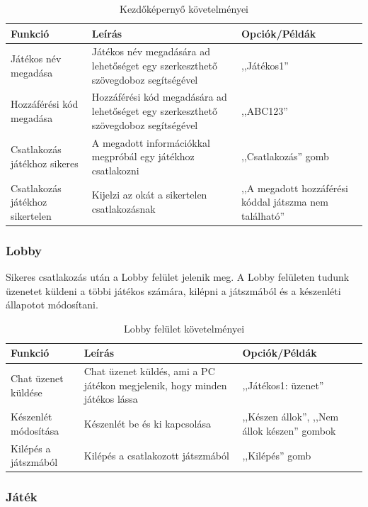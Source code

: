 \documentclass[]{thesis-ekf}
\theoremstyle{definition}
\theoremstyle{remark}
\begin{document}
\begin{table}[ht!]
	\centering
	\footnotesize
	\begin{tabular}{|p{4cm}|p{7cm}|p{4cm}|}
		\hline
		\textbf{Funkció} & \textbf{Leírás} & \textbf{Opciók/Példák} \\ 
		\hline
		Játékos név megadása & Játékos név megadására ad lehetőséget egy szerkeszthető szövegdoboz segítségével & ,,Játékos1'' \\ 
		\hline
		Hozzáférési kód megadása & Hozzáférési kód megadására ad lehetőséget egy szerkeszthető szövegdoboz segítségével & ,,ABC123'' \\ 
		\hline
		Csatlakozás játékhoz sikeres & A megadott információkkal megpróbál egy játékhoz csatlakozni & ,,Csatlakozás'' gomb \\ 
		\hline
		Csatlakozás játékhoz sikertelen & Kijelzi az okát a sikertelen csatlakozásnak & ,,A megadott hozzáférési kóddal játszma nem található'' \\ 
		\hline
	\end{tabular}
	\caption{Kezdőképernyő követelményei}
\end{table}

\subsubsection{Lobby}

Sikeres csatlakozás után a Lobby felület jelenik meg. A Lobby felületen tudunk üzenetet küldeni a többi játékos számára, kilépni a játszmából és a készenléti állapotot módosítani.

\begin{table}[ht!]
	\centering
	\footnotesize
	\begin{tabular}{|p{4cm}|p{7cm}|p{4cm}|}
		\hline
		\textbf{Funkció} & \textbf{Leírás} & \textbf{Opciók/Példák} \\ 
		\hline
		Chat üzenet küldése & Chat üzenet küldés, ami a PC játékon megjelenik, hogy minden játékos lássa & ,,Játékos1: üzenet'' \\ 
		\hline
		Készenlét módosítása & Készenlét be és ki kapcsolása & ,,Készen állok'', ,,Nem állok készen'' gombok \\ 
		\hline
		Kilépés a játszmából & Kilépés a csatlakozott játszmából & ,,Kilépés'' gomb \\ 
		\hline
	\end{tabular}
	\caption{Lobby felület követelményei}
\end{table}

\subsubsection{Játék}
\end{document}
